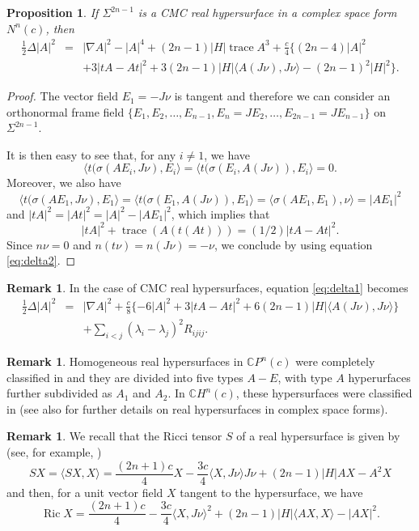 \documentclass[11pt]{amsart}
\theoremstyle{plain}
\newtheorem{proposition}  [theorem]  {Proposition}
\theoremstyle{definition}
\newtheorem{remark}       [theorem]  {Remark}
\DeclareMathOperator{\trace}{trace} \DeclareMathOperator{\di}{div}
\DeclareMathOperator{\ric}{Ric}
\numberwithin{equation}{section}
\begin{document}
\begin{proposition}\label{hyper_complex} If $\Sigma^{2n-1}$ is a CMC real hypersurface in a complex space form $N^n(c)$, then
\begin{eqnarray}\label{eq:hyper2}
\frac{1}{2}\Delta|A|^2&=&|\nabla A|^2-|A|^4+(2n-1)|H|\trace A^3+\frac{c}{4}\{(2n-4)|A|^2\\\nonumber &&+3|tA-At|^2+3(2n-1)|H|\langle A(J\nu),J\nu\rangle-(2n-1)^2|H|^2\}.
\end{eqnarray}

\end{proposition}

\begin{proof} The vector field $E_1=-J\nu$ is tangent and therefore we can consider an orthonormal frame field $\{E_1,E_2,\ldots,E_{n-1},E_n=JE_2,\ldots,E_{2n-1}=JE_{n-1}\}$ on $\Sigma^{2n-1}$.

It is then easy to see that, for any $i\neq 1$, we have 
$$
\langle t(\sigma(AE_i,J\nu),E_i\rangle=\langle t(\sigma(E_i,A(J\nu)),E_i\rangle=0.
$$
Moreover, we also have 
$$
\langle t(\sigma(AE_1,J\nu),E_1\rangle=\langle t(\sigma(E_1,A(J\nu)),E_1\rangle=\langle\sigma(AE_1,E_1),\nu\rangle=|AE_1|^2
$$
and $|tA|^2=|At|^2=|A|^2-|AE_1|^2$, which implies that 
$$
|tA|^2+\trace(A(t(At)))=(1/2)|tA-At|^2.
$$ 
Since $n\nu=0$ and $n(t\nu)=n(J\nu)=-\nu$, we conclude by using equation \eqref{eq:delta2}.
\end{proof} 

\begin{remark} In the case of CMC real hypersurfaces, equation \eqref{eq:delta1} becomes
\begin{eqnarray}\label{eq:hyper1}
\frac{1}{2}\Delta|A|^2&=&|\nabla A|^2+\frac{c}{8}\{-6|A|^2+3|tA-At|^2+6(2n-1)|H|\langle A(J\nu),J\nu\rangle\}\\\nonumber &&+\sum_{i<j}(\lambda_i-\lambda_j)^2R_{ijij}.
\end{eqnarray}
\end{remark}

\begin{remark} Homogeneous real hypersurfaces in $\mathbb{C}P^n(c)$ were completely classified in \cite{T} and they are divided into five types $A-E$, with type $A$ hyperurfaces further subdivided as $A_1$ and $A_2$. In $\mathbb{C}H^n(c)$, these hypersurfaces were classified in \cite{BT} (see also \cite{NR} for further details on real hypersurfaces in complex space forms). 
\end{remark}

\begin{remark} We recall that the Ricci tensor $S$ of a real hypersurface is given by (see, for example, \cite{NR})
\begin{equation*}
SX=\langle SX,X\rangle=\frac{(2n+1)c}{4}X-\frac{3c}{4}\langle X,J\nu\rangle J\nu+(2n-1)|H|AX-A^2X
\end{equation*}
and then, for a unit vector field $X$ tangent to the hypersurface, we have
\begin{equation}\label{Ricci}
\ric X=\frac{(2n+1)c}{4}-\frac{3c}{4}\langle X,J\nu\rangle^2+(2n-1)|H|\langle AX,X\rangle-|AX|^2.
\end{equation}

\end{remark}
\end{document}
